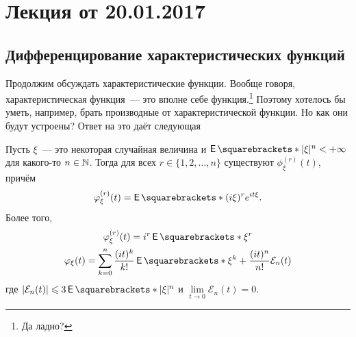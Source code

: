 \section{Лекция от 20.01.2017}
\subsection{Дифференцирование характеристических функций}
Продолжим обсуждать характеристические функции. Вообще говоря, характеристическая функция~--- это вполне себе функция.\footnote{Да ладно?} Поэтому хотелось бы уметь, например, брать производные от характеристической функции. Но как они будут устроены? Ответ на это даёт следующая
\begin{theorem}
	Пусть \(\xi\)~--- это некоторая случайная величина и \(\E{|\xi|^n} < +\infty\) для какого-то \(n \in \mathbb{N}\). Тогда для всех \(r \in \{1, 2, \dots, n\}\) существуют \(\phi_{\xi}^{(r)}(t)\), причём
	\[
		\phi_{\xi}^{(r)}(t) = \E{(i\xi)^re^{it\xi}}.
	\]
	Более того,
	\begin{gather*}
		\phi_{\xi}^{(r)}(t) = i^r\E{\xi^r} \\
		\phi_{\xi}(t) = \sum_{k = 0}^{n} \frac{(it)^k}{k!}\E{\xi^k} + \frac{(it)^n}{n!}\mathcal{E}_n(t)
	\end{gather*}
	где \(\left|\mathcal{E}_n(t)\right| \leq 3\E{|\xi|^n}\) и \(\lim\limits_{t \to 0} \mathcal{E}_n(t) = 0\).
\end{theorem}
